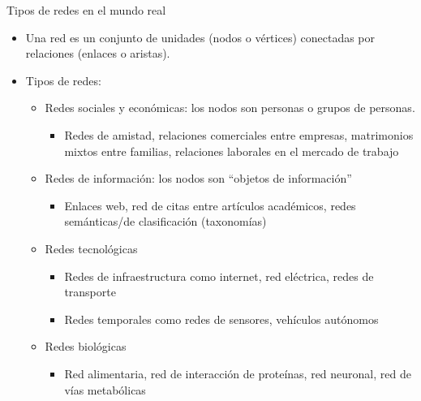 \documentclass[11pt]{beamer}
\begin{document}
\begin{frame}{Tipos de redes en el mundo real}
    \begin{itemize}
        \item Una red es un conjunto de unidades (nodos o vértices) conectadas por relaciones (enlaces o aristas).
\item Tipos de redes:
\begin{itemize}
    \item Redes sociales y económicas: los nodos son personas o grupos de personas.
    \begin{itemize}
    \item Redes de amistad, relaciones comerciales entre empresas, matrimonios mixtos entre familias, relaciones laborales en el mercado de trabajo
    \end{itemize}
\item Redes de información: los nodos son “objetos de información”
\begin{itemize}
    \item Enlaces web, red de citas entre artículos académicos, redes semánticas/de clasificación (taxonomías)
\end{itemize}
\item Redes tecnológicas
\begin{itemize}
    \item Redes de infraestructura como internet, red eléctrica, redes de transporte
\item  Redes temporales como redes de sensores, vehículos autónomos
\end{itemize}
\item Redes biológicas
\begin{itemize}
    \item Red alimentaria, red de interacción de proteínas, red neuronal, red de vías metabólicas
\end{itemize}
\end{itemize} 
    \end{itemize}
\end{frame}
\end{document}
